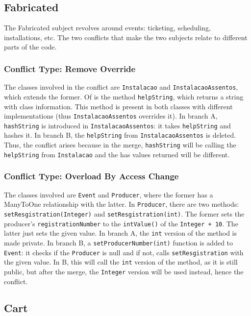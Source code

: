 \subsection{Fabricated}

The Fabricated subject revolves around events: ticketing, scheduling, installations, etc. The two
conflicts that make the two subjects relate to different parts of the code.

\subsubsection{Conflict Type: Remove Override}

The classes involved in the conflict are \texttt{Instalacao} and \texttt{InstalacaoAssentos}, which extends the former.
Of is the method \texttt{helpString}, which returns a string with class information.  This method is present
in both classes with different implementations (thus \texttt{InstalacaoAssentos} overrides it). In branch A,
\texttt{hashString} is introduced in \texttt{InstalacaoAssentos}: it takes \texttt{helpString} and hashes it. In branch B,
the \texttt{helpString} from \texttt{InstalacaoAssentos} is deleted. Thus, the conflict arises because in the merge,
\texttt{hashString} will be calling the \texttt{helpString} from \texttt{Instalacao} and the has values returned will be different.

\subsubsection{Conflict Type: Overload By Access Change}

The classes involved are \texttt{Event} and \texttt{Producer}, where the former has a ManyToOne relationship with the latter.
In \texttt{Producer}, there are two methods: \texttt{setResgistration(Integer)} and \texttt{setResgistration(int)}. The former sets
the producer's \texttt{registrationNumber} to the \texttt{intValue()} of the \texttt{Integer + 10}. The latter just sets the given value.
In branch A, the \texttt{int} version of the method is made private. In branch B, a \texttt{setProducerNumber(int)} function is added
to \texttt{Event}: it checks if the \texttt{Producer} is null and if not, calls \texttt{setResgistration} with the given value. In B, this will
call the \texttt{int} version of the method, as it is still public, but after the merge, the \texttt{Integer} version will be used instead,
hence the conflict.

\subsection{Cart}


